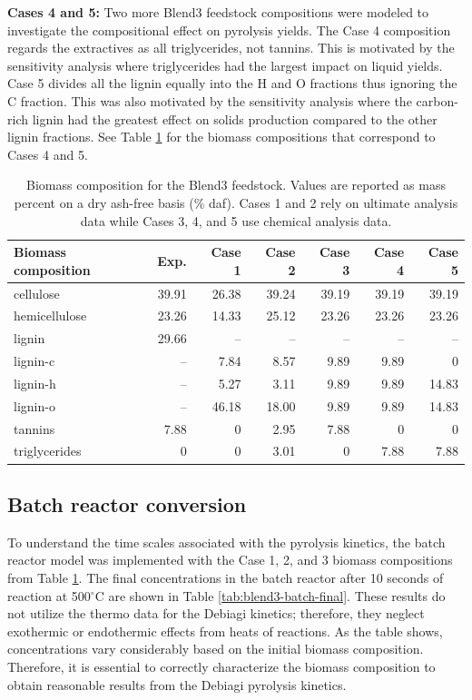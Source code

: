 \textbf{Cases 4 and 5:} Two more Blend3 feedstock compositions were modeled to investigate the compositional effect on pyrolysis yields. The Case 4 composition regards the extractives as all triglycerides, not tannins. This is motivated by the sensitivity analysis where triglycerides had the largest impact on liquid yields. Case 5 divides all the lignin equally into the H and O fractions thus ignoring the C fraction. This was also motivated by the sensitivity analysis where the carbon-rich lignin had the greatest effect on solids production compared to the other lignin fractions. See Table \ref{tab:blend3-biocomp} for the biomass compositions that correspond to Cases 4 and 5.

\begin{table}[H]
    \centering
    \caption{Biomass composition for the Blend3 feedstock. Values are reported as mass percent on a dry ash-free basis (\% daf). Cases 1 and 2 rely on ultimate analysis data while Cases 3, 4, and 5 use chemical analysis data.}
    \label{tab:blend3-biocomp}
    \begin{tabular}{lrrrrrr}
        \toprule
        Biomass composition & Exp. & Case 1 & Case 2 & Case 3 & Case 4 & Case 5 \\
        \midrule
        cellulose     & 39.91 & 26.38 & 39.24 & 39.19 & 39.19 & 39.19 \\
        hemicellulose & 23.26 & 14.33 & 25.12 & 23.26 & 23.26 & 23.26 \\
        lignin        & 29.66 & --    & --    & --    & --    & --    \\
        lignin-c      & --    & 7.84  & 8.57  & 9.89  & 9.89  & 0     \\
        lignin-h      & --    & 5.27  & 3.11  & 9.89  & 9.89  & 14.83 \\
        lignin-o      & --    & 46.18 & 18.00 & 9.89  & 9.89  & 14.83 \\
        tannins       & 7.88  & 0     & 2.95  & 7.88  & 0     & 0     \\
        triglycerides & 0     & 0     & 3.01  & 0     & 7.88  & 7.88  \\
        \bottomrule
    \end{tabular}
\end{table}

\subsection{Batch reactor conversion}

To understand the time scales associated with the pyrolysis kinetics, the batch reactor model was implemented with the Case 1, 2, and 3 biomass compositions from Table \ref{tab:blend3-biocomp}. The final concentrations in the batch reactor after 10 seconds of reaction at 500$^{\circ}$C are shown in Table \ref{tab:blend3-batch-final}. These results do not utilize the thermo data for the Debiagi kinetics; therefore, they neglect exothermic or endothermic effects from heats of reactions. As the table shows, concentrations vary considerably based on the initial biomass composition. Therefore, it is essential to correctly characterize the biomass composition to obtain reasonable results from the Debiagi pyrolysis kinetics.

